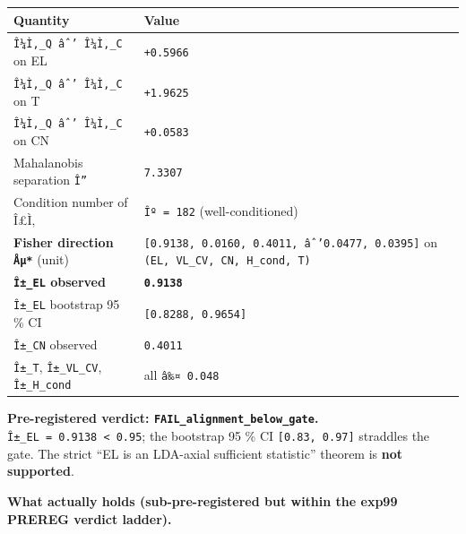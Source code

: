 \documentclass[
]{article}
\newcounter{none} %
\begin{document}
{\def\LTcaptype{none} %
\begin{longtable}[]{@{}
  >{\raggedright\arraybackslash}p{}
  >{\raggedleft\arraybackslash}p{}@{}}
\toprule\noalign{}
\begin{minipage}[b]{\linewidth}\raggedright
Quantity
\end{minipage} & \begin{minipage}[b]{\linewidth}\raggedleft
Value
\end{minipage} \\
\midrule\noalign{}
\endhead
\bottomrule\noalign{}
\endlastfoot
\texttt{Î¼Ì‚\_Q\ âˆ’\ Î¼Ì‚\_C} on EL & \texttt{+0.5966} \\
\texttt{Î¼Ì‚\_Q\ âˆ’\ Î¼Ì‚\_C} on T & \texttt{+1.9625} \\
\texttt{Î¼Ì‚\_Q\ âˆ’\ Î¼Ì‚\_C} on CN & \texttt{+0.0583} \\
Mahalanobis separation \texttt{Î”} & \texttt{7.3307} \\
Condition number of Î£Ì‚ & \texttt{Îº\ =\ 182} (well-conditioned) \\
\textbf{Fisher direction \texttt{Åµ*}} (unit) &
\texttt{{[}0.9138,\ 0.0160,\ 0.4011,\ âˆ’0.0477,\ 0.0395{]}} on
\texttt{(EL,\ VL\_CV,\ CN,\ H\_cond,\ T)} \\
\textbf{\texttt{Î±\_EL} observed} & \textbf{\texttt{0.9138}} \\
\texttt{Î±\_EL} bootstrap 95 \% CI & \texttt{{[}0.8288,\ 0.9654{]}} \\
\texttt{Î±\_CN} observed & \texttt{0.4011} \\
\texttt{Î±\_T}, \texttt{Î±\_VL\_CV}, \texttt{Î±\_H\_cond} & all
\texttt{â‰¤\ 0.048} \\
\end{longtable}
}

\textbf{Pre-registered verdict: \texttt{FAIL\_alignment\_below\_gate}.}
\texttt{Î±\_EL\ =\ 0.9138\ \textless{}\ 0.95}; the bootstrap 95 \% CI
\texttt{{[}0.83,\ 0.97{]}} straddles the gate. The strict ``EL is an
LDA-axial sufficient statistic'' theorem is \textbf{not supported}.

\textbf{What actually holds (sub-pre-registered but within the exp99
PREREG verdict ladder).}
\end{document}
